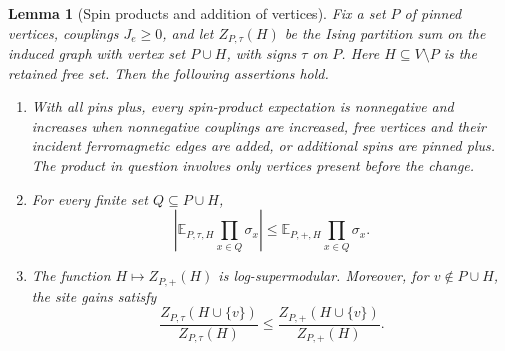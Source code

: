 \documentclass[11pt]{article}
\newtheorem{lemma}[theorem]{Lemma}
\theoremstyle{definition}
\theoremstyle{remark}
\numberwithin{equation}{section}
\begin{document}
\begin{lemma}[Spin products and addition of vertices]
\label{tr:site-gain}
Fix a set $P$ of pinned vertices, couplings $J_e\geq0$, and let
$Z_{P,\tau}(H)$ be the Ising partition sum on the induced graph with vertex
set $P\cup H$, with signs $\tau$ on $P$. Here $H\subseteq V\setminus P$ is
the retained free set. Then the following assertions hold.
\begin{enumerate}
\item With all pins plus, every spin-product expectation is nonnegative and
increases when nonnegative couplings are increased, free vertices and their
incident ferromagnetic edges are added, or additional spins are pinned plus.
The product in question involves only vertices present before the change.
\item For every finite set $Q\subseteq P\cup H$,
\begin{equation}
\label{tr:mixed-product}
 \left|\mathbb E_{P,\tau,H}\prod_{x\in Q}\sigma_x\right|
 \leq \mathbb E_{P,+,H}\prod_{x\in Q}\sigma_x.
\end{equation}
\item The function $H\mapsto Z_{P,+}(H)$ is log-supermodular. Moreover,
for $v\notin P\cup H$, the site gains satisfy
\begin{equation}
\label{tr:gain-comparison}
 \frac{Z_{P,\tau}(H\cup\{v\})}{Z_{P,\tau}(H)}
 \leq
 \frac{Z_{P,+}(H\cup\{v\})}{Z_{P,+}(H)}.
\end{equation}
\end{enumerate}
\end{lemma}
\end{document}
